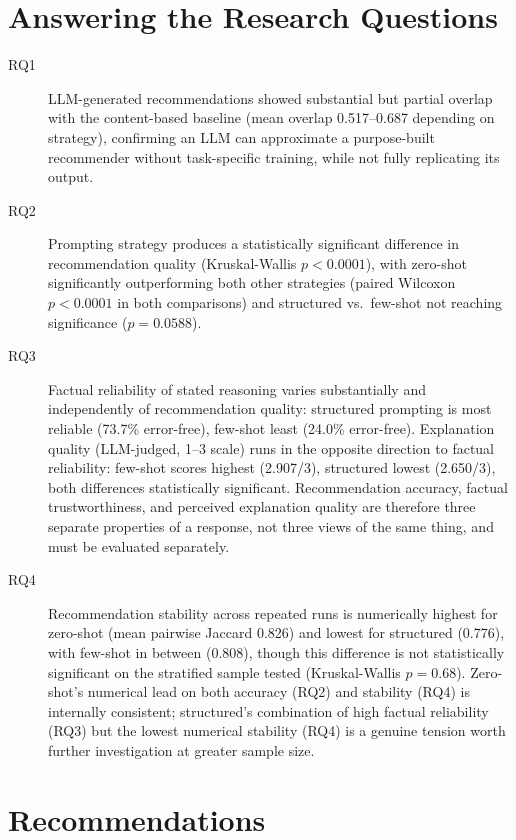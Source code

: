 \section{Answering the Research Questions}

\begin{description}
    \item[RQ1] LLM-generated recommendations showed substantial but partial overlap with the content-based baseline (mean overlap 0.517--0.687 depending on strategy), confirming an LLM can approximate a purpose-built recommender without task-specific training, while not fully replicating its output.
    \item[RQ2] Prompting strategy produces a statistically significant difference in recommendation quality (Kruskal-Wallis $p < 0.0001$), with zero-shot significantly outperforming both other strategies (paired Wilcoxon $p < 0.0001$ in both comparisons) and structured vs.\ few-shot not reaching significance ($p = 0.0588$).
    \item[RQ3] Factual reliability of stated reasoning varies substantially and independently of recommendation quality: structured prompting is most reliable (73.7\% error-free), few-shot least (24.0\% error-free). Explanation quality (LLM-judged, 1--3 scale) runs in the opposite direction to factual reliability: few-shot scores highest (2.907/3), structured lowest (2.650/3), both differences statistically significant. Recommendation accuracy, factual trustworthiness, and perceived explanation quality are therefore three separate properties of a response, not three views of the same thing, and must be evaluated separately.
    \item[RQ4] Recommendation stability across repeated runs is numerically highest for zero-shot (mean pairwise Jaccard 0.826) and lowest for structured (0.776), with few-shot in between (0.808), though this difference is not statistically significant on the stratified sample tested (Kruskal-Wallis $p = 0.68$). Zero-shot's numerical lead on both accuracy (RQ2) and stability (RQ4) is internally consistent; structured's combination of high factual reliability (RQ3) but the lowest numerical stability (RQ4) is a genuine tension worth further investigation at greater sample size.
\end{description}

\section{Recommendations}

